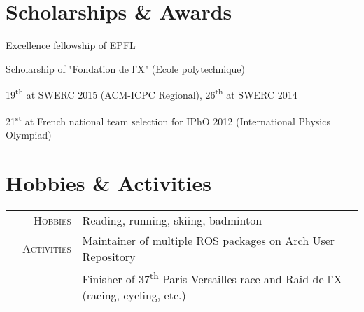 \documentclass[a4paper,10pt]{article} %
\begin{document}

\section{Scholarships \& Awards}

\begin{dinglist}{67} \itemsep -4pt
\item Excellence fellowship of EPFL
\item Scholarship of "Fondation de l’X" (Ecole polytechnique)
\item 19\textsuperscript{th} at SWERC 2015 (ACM-ICPC Regional), 26\textsuperscript{th} at SWERC 2014
\item 21\textsuperscript{st} at French national team selection for IPhO 2012 (International Physics Olympiad) 
\end{dinglist}


\section{Hobbies \& Activities}

\begin{tabular}{p{0.153cm}rp{15cm}}

& \textsc{Hobbies} & Reading, running, skiing, badminton \vspace{0.1cm} \\
& \textsc{Activities} & Maintainer of multiple ROS packages on Arch User Repository \\
& & Finisher of 37\textsuperscript{th} Paris-Versailles race and Raid de l'X (racing, cycling, etc.) \\

\end{tabular}









\end{document}
